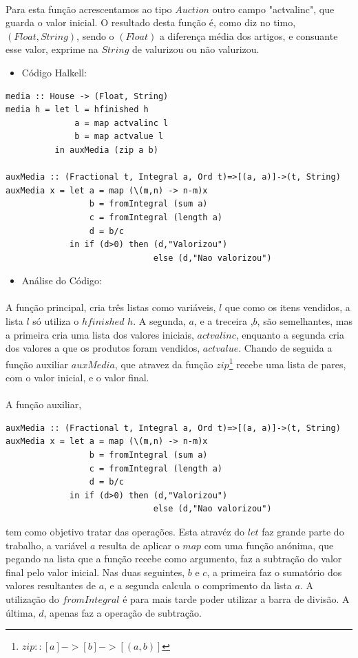 \documentclass[a4paper]{article}
\begin{document}
\begin{enumerate}
\paragraph{}Para esta função acrescentamos ao tipo $Auction$ outro campo "actvalinc", que guarda o valor inicial. O resultado desta função é, como diz no timo, $(Float, String)$, sendo o $(Float)$ a diferença média dos artigos, e consuante esse valor, exprime na $String$ de valurizou ou não valurizou.
\begin{itemize}
\item{Código Halkell:}
\end{itemize}
\begin{verbatim}
media :: House -> (Float, String)
media h = let l = hfinished h
              a = map actvalinc l
              b = map actvalue l
          in auxMedia (zip a b)

auxMedia :: (Fractional t, Integral a, Ord t)=>[(a, a)]->(t, String)
auxMedia x = let a = map (\(m,n) -> n-m)x
                 b = fromIntegral (sum a)
                 c = fromIntegral (length a)
                 d = b/c
             in if (d>0) then (d,"Valorizou") 
                              else (d,"Nao valorizou") 
\end{verbatim}
\newpage
\begin{itemize}
\item{Análise do Código:}
\end{itemize}
\paragraph{}A função principal, cria três listas como variáveis, $l$ que como os itens vendidos, a lista $l$ só utiliza o $hfinished$ $h$. A segunda, $a$, e a treceira ,$b$, são semelhantes, mas a primeira cria uma lista dos valores iniciais, $actvalinc$, enquanto a segunda cria dos valores a que os produtos foram vendidos, $actvalue$. Chando de seguida a função auxiliar $auxMedia$, que atravez da função $zip$\footnote{$zip :: [a] -> [b] -> [(a,b)]$} recebe uma lista de pares, com o valor inicial, e o valor final.  
\paragraph{}A função auxiliar,
\begin{verbatim}
auxMedia :: (Fractional t, Integral a, Ord t)=>[(a, a)]->(t, String)
auxMedia x = let a = map (\(m,n) -> n-m)x
                 b = fromIntegral (sum a)
                 c = fromIntegral (length a)
                 d = b/c
             in if (d>0) then (d,"Valorizou") 
                              else (d,"Nao valorizou") 
\end{verbatim}
tem como objetivo tratar das operações. Esta atravéz do $let$ faz grande parte do trabalho, a variável $a$ resulta de aplicar o $map$ com uma função anónima, que pegando na lista que a função recebe como argumento, faz a subtração do valor final pelo valor inicial. Nas duas seguintes, $b$ e $c$, a primeira faz o sumatório dos valores resultantes de $a$, e a segunda calcula o comprimento da lista $a$. A utilização do $fromIntegral$ é para mais tarde poder utilizar a barra de divisão. A última, $d$, apenas faz a operação de subtração.

\end{enumerate}
\end{document}
